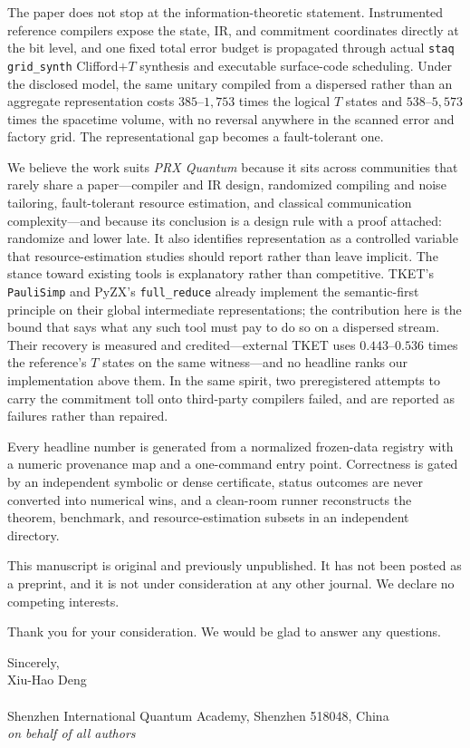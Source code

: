 \documentclass[11pt]{article}
\newcommand{\AuthorName}{Xiu-Hao Deng}
\newcommand{\AuthorPosition}{}
\newcommand{\AuthorInstitutionA}{Shenzhen International Quantum Academy, Shenzhen 518048, China}
\newcommand{\PositionLine}{%
  \ifx\AuthorPosition\empty\else\AuthorPosition\\\fi}
\begin{document}
The paper does not stop at the information-theoretic statement. Instrumented
reference compilers expose the state, IR, and commitment coordinates directly
at the bit level, and one fixed total error budget is propagated through actual
\texttt{staq grid\_synth} Clifford$+T$ synthesis and executable surface-code
scheduling. Under the disclosed model, the same unitary compiled from a
dispersed rather than an aggregate representation costs $385$--$1{,}753$ times
the logical $T$ states and $538$--$5{,}573$ times the spacetime volume, with no
reversal anywhere in the scanned error and factory grid. The representational
gap becomes a fault-tolerant one.

We believe the work suits \textit{PRX Quantum} because it sits across
communities that rarely share a paper---compiler and IR design, randomized
compiling and noise tailoring, fault-tolerant resource estimation, and
classical communication complexity---and because its conclusion is a design
rule with a proof attached: randomize and lower late. It also identifies
representation as a controlled variable that resource-estimation studies should
report rather than leave implicit. The stance toward existing tools is
explanatory rather than competitive. TKET's \texttt{PauliSimp} and PyZX's
\texttt{full\_reduce} already implement the semantic-first principle on their
global intermediate representations; the contribution here is the bound that
says what any such tool must pay to do so on a dispersed stream. Their recovery
is measured and credited---external TKET uses $0.443$--$0.536$ times the
reference's $T$ states on the same witness---and no headline ranks our
implementation above them. In the same spirit, two preregistered attempts to
carry the commitment toll onto third-party compilers failed, and are reported
as failures rather than repaired.

Every headline number is generated from a normalized frozen-data registry with
a numeric provenance map and a one-command entry point. Correctness is gated by
an independent symbolic or dense certificate, status outcomes are never
converted into numerical wins, and a clean-room runner reconstructs the
theorem, benchmark, and resource-estimation subsets in an independent
directory.

This manuscript is original and previously unpublished. It has not been posted
as a preprint, and it is not under consideration at any other journal. We
declare no competing interests.

Thank you for your consideration. We would be glad to answer any questions.

\vspace{1.5\baselineskip}

{\raggedright
Sincerely,\\[2.5\baselineskip]
\AuthorName\\
\PositionLine
\AuthorInstitutionA\\
\textit{on behalf of all authors}\par}
\end{document}
